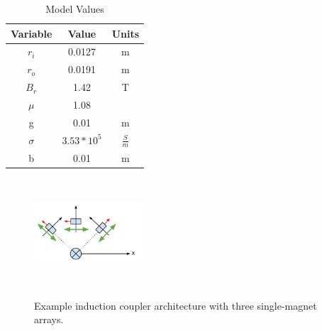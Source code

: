 \begin{table}[ht]
\caption{Model Values} %
\centering %
\begin{tabular}{c c c} %
\hline\hline %
Variable & Value & Units\\ [0.5ex] %
\hline

$r_i$ & 0.0127 & m\\  
$r_o$ & 0.0191 & m \\
$B_r$ & 1.42 & T \\
$\mu$ & 1.08 & \\
g & 0.01 & m\\

$\sigma$ & $3.53 * 10^5$ & $\frac{S}{m}$ \\
b & 0.01 & m

 \\ [1ex] %
\hline %
\end{tabular}
\label{table:values} %
\end{table}


\begin{figure}
\includegraphics[width = 4cm, height = 4cm ]{figures/sample_coupler.png}
\label{fig:sample_coupler}
\caption{Example induction coupler architecture with three single-magnet arrays.}
\end{figure}